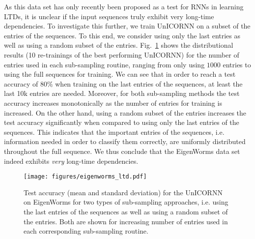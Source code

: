 \documentclass{article}
\newcommand{\fref}[1] {Fig.~\ref{#1}}
\begin{document}
\par As this data set has only recently been proposed as a test for RNNs in learning LTDs, it is unclear if the input sequences truly exhibit very long-time dependencies. To investigate this further, we train UnICORNN on a subset of the entries of the sequences. To this end, we consider using only the last entries as well as using a random subset of the entries. \fref{fig:worms} shows the distributional results (10 re-trainings of the best performing UnICORNN) for the number of entries used in each sub-sampling routine, ranging from only using $1000$ entries to using the full sequences for training. We can see that in order to reach a test accuracy of $80\%$ when training on the last entries of the sequences, at least the last 10k entries are needed. Moreover, for both sub-sampling methods the test accuracy increases monotonically as the number of entries for training is increased. On the other hand, using a random subset of the entries increases the test accuracy significantly when compared to using only the last entries of the sequences. This indicates that the important entries of the sequences, i.e. information needed in order to classify them correctly, are uniformly distributed throughout the full sequence. We thus conclude that the EigenWorms data set indeed exhibits \emph{very} long-time dependencies.

\begin{figure}[ht]
\vskip 0.2in
\begin{center}
\centerline{\texttt{[image: figures/eigenworms\_ltd.pdf]}}
\caption{Test accuracy (mean and standard deviation) for the UnICORNN on EigenWorms for two types of sub-sampling approaches, i.e. using the last entries of the sequences as well as using a random subset of the entries. Both are shown for increasing number of entries used in each corresponding sub-sampling routine.}
\label{fig:worms}
\end{center}
\vskip -0.2in
\end{figure}
\end{document}
